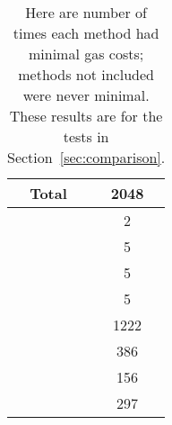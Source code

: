 \begin{table}[p]
\centering
\begin{tabular}{|c|S[table-format=4.0]|}
\hline
Total & 2048 \\
\hline
\Uniswap{}       &    2 \\
\python{}        &    5 \\
\UnrolledOne{}   &    5 \\
\UnrolledTwo{}   &    5 \\
 \UnrolledThree{} &  1222 \\
\WhileOne{}      &  386 \\
\WhileTwo{}      &  156 \\
\WhileThree{}    &  297 \\
\hline
\end{tabular}
\caption[Minimal Gas Costs Statistics]{Here are number of times
    each method had minimal gas costs;
    methods not included were never minimal.
    These results are for the tests in Section~\ref{sec:comparison}.
    }
\label{table:minimal_gas_costs}
\end{table}
